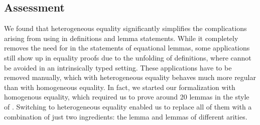 \documentclass[sigplan,anonymous,review,screen]{acmart}
\begin{document}
\subsection{Assessment}
\label{sec:assessment}
We found that heterogeneous equality significantly simplifies the complications arising from
using {\Asubst} in definitions and lemma statements. While it completely removes the need for
{\Asubst} in the statements of equational lemmas, some {\Asubst}
applications still show up in equality proofs due to the unfolding of definitions, where {\Asubst}
cannot be avoided in an intrinsically typed setting.
These {\Asubst} applications have to be removed manually, which with heterogeneous
equality behaves much more regular than with homogeneous equality. In
fact, we started our formalization with homogenous equality,
which required us to prove around 20 lemmas in the style of
. Switching to heterogeneous equality enabled us to
replace all of them with a combination of just two ingredients: the {}
lemma and {} lemmas of different arities.












\end{document}
